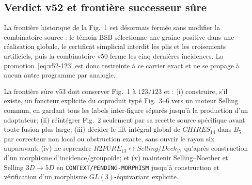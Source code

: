 \subsection{Verdict v52 et frontière successeur sûre}

La frontière historique de la Fig.~1 est désormais fermée sans modifier la combinatoire source : le témoin BSB sélectionne une graine positive dans une réalisation globale, le certificat simplicial interdit les plis et les croisements artificiels, puis la combinatoire v50 ferme les cinq dernières incidences. La promotion~\eqref{eq:v52-123} est donc restreinte à ce carrier exact et ne se propage à aucun autre programme par analogie.

La frontière sûre v53 doit conserver Fig.~1 à $123/123$ et : (i) construire, s'il existe, un foncteur explicite du coproduit typé Fig.~3--6 vers un moteur Selling commun, en gardant tous les labels inter-figure séparés jusqu'à la production d'un adaptateur; (ii) réintégrer Fig.~2 seulement par sa recette source spécifique avant toute fusion plus large; (iii) décider le lift intégral global de $CHIRES_{14}$ dans $B_5$ par correcteur non local ou obstruction exacte, sans ouvrir le rayon six auparavant; (iv) ne reprendre $R2PURE_{13}\leftrightarrow Selling/Deck_{17}$ qu'après construction d'un morphisme d'incidence/groupoïde; et (v) maintenir Selling--Noether et Selling $3D\to5D$ en \texttt{CONTEXT/PENDING-MORPHISM} jusqu'à construction et vérification d'un morphisme $GL(3)$-équivariant explicite.


